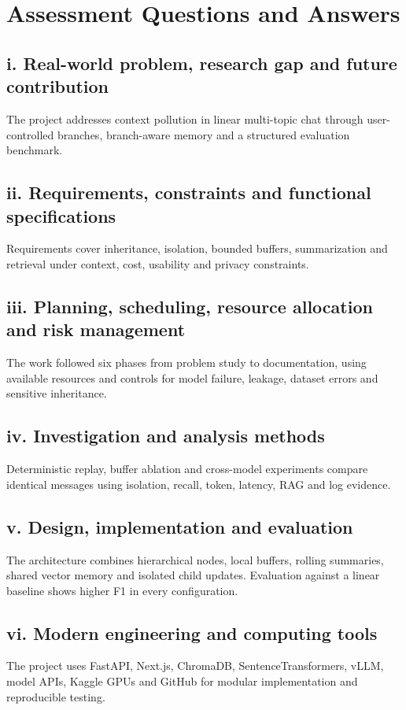 \section{Assessment Questions and Answers}

\subsection*{i. Real-world problem, research gap and future contribution}
The project addresses context pollution in linear multi-topic chat through user-controlled branches, branch-aware memory and a structured evaluation benchmark.

\subsection*{ii. Requirements, constraints and functional specifications}
Requirements cover inheritance, isolation, bounded buffers, summarization and retrieval under context, cost, usability and privacy constraints.

\subsection*{iii. Planning, scheduling, resource allocation and risk management}
The work followed six phases from problem study to documentation, using available resources and controls for model failure, leakage, dataset errors and sensitive inheritance.

\subsection*{iv. Investigation and analysis methods}
Deterministic replay, buffer ablation and cross-model experiments compare identical messages using isolation, recall, token, latency, RAG and log evidence.

\subsection*{v. Design, implementation and evaluation}
The architecture combines hierarchical nodes, local buffers, rolling summaries, shared vector memory and isolated child updates. Evaluation against a linear baseline shows higher F1 in every configuration.

\subsection*{vi. Modern engineering and computing tools}
The project uses FastAPI, Next.js, ChromaDB, SentenceTransformers, vLLM, model APIs, Kaggle GPUs and GitHub for modular implementation and reproducible testing.

